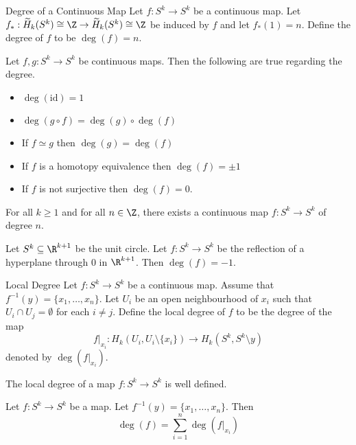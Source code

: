 \documentclass[a4paper]{article}
\begin{document}
\begin{defn}{Degree of a Continuous Map}{} Let $f:S^k\to S^k$ be a continuous map. Let $f_\ast:\widetilde{H}_k(S^k)\cong\Z\to\widetilde{H}_k(S^k)\cong\Z$ be induced by $f$ and let $f_\ast(1)=n$. Define the degree of $f$ to be $\deg(f)=n$. 
\end{defn}

\begin{lmm}{}{} Let $f,g:S^k\to S^k$ be continuous maps. Then the following are true regarding the degree. 
\begin{itemize}
\item $\deg(\text{id})=1$
\item $\deg(g\circ f)=\deg(g)\circ\deg(f)$
\item If $f\simeq g$ then $\deg(g)=\deg(f)$
\item If $f$ is a homotopy equivalence then $\deg(f)=\pm1$
\item If $f$ is not surjective then $\deg(f)=0$. 
\end{itemize}
\end{lmm}

\begin{prp}{}{} For all $k\geq 1$ and for all $n\in\Z$, there exists a continuous map $f:S^k\to S^k$ of degree $n$. 
\end{prp}

\begin{lmm}{}{} Let $S^k\subseteq\R^{k+1}$ be the unit circle. Let $f:S^k\to S^k$ be the reflection of a hyperplane through $0$ in $\R^{k+1}$. Then $\deg(f)=-1$. 
\end{lmm}

\begin{defn}{Local Degree}{} Let $f:S^k\to S^k$ be a continuous map. Assume that $f^{-1}(y)=\{x_1,\dots,x_n\}$. Let $U_i$ be an open neighbourhood of $x_i$ such that $U_i\cap U_j=\emptyset$ for each $i\neq j$. Define the local degree of $f$ to be the degree of the map $$f|_{x_i}:H_k(U_i,U_i\setminus\{x_i\})\to H_k(S^k,S^k\setminus{y})$$ denoted by $\deg(f|_{x_i})$. 
\end{defn}

\begin{lmm}{}{} The local degree of a map $f:S^k\to S^k$ is well defined. 
\end{lmm}

\begin{prp}{}{} Let $f:S^k\to S^k$ be a map. Let $f^{-1}(y)=\{x_1,\dots,x_n\}$. Then $$\deg(f)=\sum_{i=1}^n\deg(f|_{x_i})$$
\end{prp}
\end{document}
